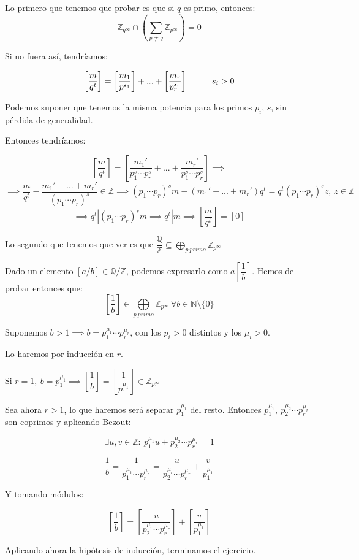 \documentclass[openany]{book}
\begin{document}
\begin{exercise}
    $ $

    Lo primero que tenemos que probar es que si $ q $ es primo, entonces:
    $$ \mathbb{Z}_{q^{\infty}} \cap \left( \sum\limits_{p\ne q}^{}\mathbb{Z}_{p^{\infty}} \right) = 0 $$

    Si no fuera así, tendríamos:

    $$ \left[\dfrac{m}{q^{t}}\right] = \left[\dfrac{m_1}{p^{s_1}}\right] +...+ \left[\dfrac{m_{r}}{p_{r}^{s_{r}}}\right] \hspace{10mm} s_i > 0 $$

    Podemos suponer que tenemos la misma potencia para los primos $ p_i$, $ s$, sin pérdida de generalidad.
    
    Entonces tendríamos:

    $$ \left[\dfrac{m}{q^{t}}\right] = \left[\dfrac{m_1'}{p_1^{s}\cdots p_{r}^{s}}+...+\dfrac{m_{r}'}{p_1^{s}\cdots p_{r}^{s}}\right] \implies  $$
    $$ \implies \dfrac{m}{q^{t}} - \dfrac{m_1'+...+m_{r}'}{(p_1 \cdots p_{r})^{s}} \in \mathbb{Z} \implies (p_1 \cdots p_{r})^{s} m -(m_1' +...+ m_{r}') q^{t} = q^{t} (p_1 \cdots p_{r})^{s}z,\ z \in \mathbb{Z} $$
    $$ \implies q^{t}| (p_1\cdots p_{r})^{s} m \implies q^{t} | m \implies \left[\dfrac{m}{q^{t}}\right] = [0]$$

    Lo segundo que tenemos que ver es que $ \dfrac{\mathbb{Q}}{\mathbb{Z}} \subseteq  \bigoplus \limits_{p\ primo} \mathbb{Z}_{p^{\infty}} $

    Dado un elemento $ [a/b] \in \mathbb{Q}/\mathbb{Z}$, podemos expresarlo como $ a\left[\dfrac{1}{b}\right]$. Hemos de probar entonces que:
    $$ \left[\dfrac{1}{b}\right] \in \bigoplus\limits_{p\ primo}\mathbb{Z}_{p^{\infty}} \ \forall b \in \mathbb{N} \setminus \{0\}$$

    Suponemos $ b > 1 \implies b = p_1^{\mu_1}\cdots p_{r}^{\mu_{r}}$, con los $ p_i>0$ distintos y  los $ \mu_{i} > 0$.

    Lo haremos por inducción en $ r$.

    Si $ r = 1,\ b = p_1^{\mu_1} \implies \left[\dfrac{1}{b}\right] = \left[\dfrac{1}{p_1^{\mu_1}}\right] \in \mathbb{Z}_{p_1^{\infty}}$

    Sea ahora $ r > 1$, lo que haremos será separar $ p_1^{\mu_1}$ del resto. Entonces $ p_1^{\mu_1},\ p_2^{\mu_2}\cdots p_{r}^{\mu_{r}}$ son coprimos y aplicando Bezout:

    $$ \exists u,v \in \mathbb{Z} :\ p_1^{\mu_1}u + p_2^{\mu_2} \cdots p_{r}^{\mu_{r}} = 1 $$

    $$ \dfrac{1}{b} = \dfrac{1}{p_1^{\mu_1}\cdots p_{r}^{\mu_{r}}} = \dfrac{u}{p_2^{\mu_{r}}\cdots p_{r}^{\mu_{r}}} + \dfrac{v}{p_1^{\mu_{1}}} $$

    Y tomando módulos:

    $$ \left[\dfrac{1}{b}\right] = \left[\dfrac{u}{p_2^{\mu_{r}}\cdots p_{r}^{\mu_{r}}} \right]+ \left[\dfrac{v}{p_1^{\mu_{1}}}\right] $$

    Aplicando ahora la hipótesis de inducción, terminamos el ejercicio.

\end{exercise}
\end{document}
